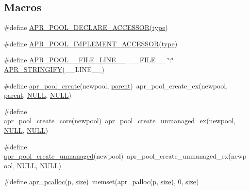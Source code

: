 \subsection*{Macros}
\begin{DoxyCompactItemize}
\item 
\#define \hyperlink{group__apr__pools_ga89ce1d55c7f0c39ea87c88eabd655394}{A\+P\+R\+\_\+\+P\+O\+O\+L\+\_\+\+D\+E\+C\+L\+A\+R\+E\+\_\+\+A\+C\+C\+E\+S\+S\+OR}(\hyperlink{pcre_8txt_a2463fbbe8b0c90b90db12195e1edaa5d}{type})
\item 
\#define \hyperlink{group__apr__pools_ga43a8a52f68f8b7d3b7694c254da4a074}{A\+P\+R\+\_\+\+P\+O\+O\+L\+\_\+\+I\+M\+P\+L\+E\+M\+E\+N\+T\+\_\+\+A\+C\+C\+E\+S\+S\+OR}(\hyperlink{pcre_8txt_a2463fbbe8b0c90b90db12195e1edaa5d}{type})
\item 
\#define \hyperlink{group__apr__pools_gac81cff34d0ff4be52fa924663478eade}{A\+P\+R\+\_\+\+P\+O\+O\+L\+\_\+\+\_\+\+F\+I\+L\+E\+\_\+\+L\+I\+N\+E\+\_\+\+\_\+}~\+\_\+\+\_\+\+F\+I\+L\+E\+\_\+\+\_\+ \char`\"{}\+:\char`\"{} \hyperlink{apr__version_8h_ae90215615972dfa4108018304361ef0b}{A\+P\+R\+\_\+\+S\+T\+R\+I\+N\+G\+I\+FY}(\+\_\+\+\_\+\+L\+I\+N\+E\+\_\+\+\_\+)
\item 
\#define \hyperlink{group__apr__pools_gaa7c40921aae156b665e82b0a66991a39}{apr\+\_\+pool\+\_\+create}(newpool,  \hyperlink{group__apr__pools_ga3eb8c52002440da9a3eed11d54d08dd5}{parent})~apr\+\_\+pool\+\_\+create\+\_\+ex(newpool, \hyperlink{group__apr__pools_ga3eb8c52002440da9a3eed11d54d08dd5}{parent}, \hyperlink{pcre_8txt_ad7f989d16aa8ca809a36bc392c07fba1}{N\+U\+LL}, \hyperlink{pcre_8txt_ad7f989d16aa8ca809a36bc392c07fba1}{N\+U\+LL})
\item 
\#define \hyperlink{group__apr__pools_gac5b45d10dd235432a214079792714226}{apr\+\_\+pool\+\_\+create\+\_\+core}(newpool)~apr\+\_\+pool\+\_\+create\+\_\+unmanaged\+\_\+ex(newpool, \hyperlink{pcre_8txt_ad7f989d16aa8ca809a36bc392c07fba1}{N\+U\+LL}, \hyperlink{pcre_8txt_ad7f989d16aa8ca809a36bc392c07fba1}{N\+U\+LL})
\item 
\#define \hyperlink{group__apr__pools_ga03a06feb239bed9edd79a4f59679d56b}{apr\+\_\+pool\+\_\+create\+\_\+unmanaged}(newpool)~apr\+\_\+pool\+\_\+create\+\_\+unmanaged\+\_\+ex(newpool, \hyperlink{pcre_8txt_ad7f989d16aa8ca809a36bc392c07fba1}{N\+U\+LL}, \hyperlink{pcre_8txt_ad7f989d16aa8ca809a36bc392c07fba1}{N\+U\+LL})
\item 
\#define \hyperlink{group__apr__pools_gad214fc0160de3c22b6435e29ea20fce8}{apr\+\_\+pcalloc}(\hyperlink{group__APACHE__CORE__MPM_ga5cd91701e5c167f2b1a38e70ab57817e}{p},  \hyperlink{README_8txt_a870076999eb1486aa63d2e2cf5cdfa55}{size})~memset(apr\+\_\+palloc(\hyperlink{group__APACHE__CORE__MPM_ga5cd91701e5c167f2b1a38e70ab57817e}{p}, \hyperlink{README_8txt_a870076999eb1486aa63d2e2cf5cdfa55}{size}), 0, \hyperlink{README_8txt_a870076999eb1486aa63d2e2cf5cdfa55}{size})
\end{DoxyCompactItemize}
